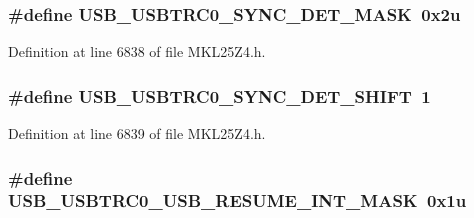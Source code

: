 \subsubsection[{\texorpdfstring{U\+S\+B\+\_\+\+U\+S\+B\+T\+R\+C0\+\_\+\+S\+Y\+N\+C\+\_\+\+D\+E\+T\+\_\+\+M\+A\+SK}{USB_USBTRC0_SYNC_DET_MASK}}]{\setlength{\rightskip}{0pt plus 5cm}\#define U\+S\+B\+\_\+\+U\+S\+B\+T\+R\+C0\+\_\+\+S\+Y\+N\+C\+\_\+\+D\+E\+T\+\_\+\+M\+A\+SK~0x2u}\hypertarget{group___u_s_b___register___masks_ga2e2f3b4bb79885ed92d75c9f86d42e23}{}\label{group___u_s_b___register___masks_ga2e2f3b4bb79885ed92d75c9f86d42e23}


Definition at line 6838 of file M\+K\+L25\+Z4.\+h.

\subsubsection[{\texorpdfstring{U\+S\+B\+\_\+\+U\+S\+B\+T\+R\+C0\+\_\+\+S\+Y\+N\+C\+\_\+\+D\+E\+T\+\_\+\+S\+H\+I\+FT}{USB_USBTRC0_SYNC_DET_SHIFT}}]{\setlength{\rightskip}{0pt plus 5cm}\#define U\+S\+B\+\_\+\+U\+S\+B\+T\+R\+C0\+\_\+\+S\+Y\+N\+C\+\_\+\+D\+E\+T\+\_\+\+S\+H\+I\+FT~1}\hypertarget{group___u_s_b___register___masks_ga986ea3386acad15ab845a8c5d9644c9e}{}\label{group___u_s_b___register___masks_ga986ea3386acad15ab845a8c5d9644c9e}


Definition at line 6839 of file M\+K\+L25\+Z4.\+h.

\subsubsection[{\texorpdfstring{U\+S\+B\+\_\+\+U\+S\+B\+T\+R\+C0\+\_\+\+U\+S\+B\+\_\+\+R\+E\+S\+U\+M\+E\+\_\+\+I\+N\+T\+\_\+\+M\+A\+SK}{USB_USBTRC0_USB_RESUME_INT_MASK}}]{\setlength{\rightskip}{0pt plus 5cm}\#define U\+S\+B\+\_\+\+U\+S\+B\+T\+R\+C0\+\_\+\+U\+S\+B\+\_\+\+R\+E\+S\+U\+M\+E\+\_\+\+I\+N\+T\+\_\+\+M\+A\+SK~0x1u}\hypertarget{group___u_s_b___register___masks_ga9c943cc95fdf52fa40311292f2801518}{}\label{group___u_s_b___register___masks_ga9c943cc95fdf52fa40311292f2801518}



